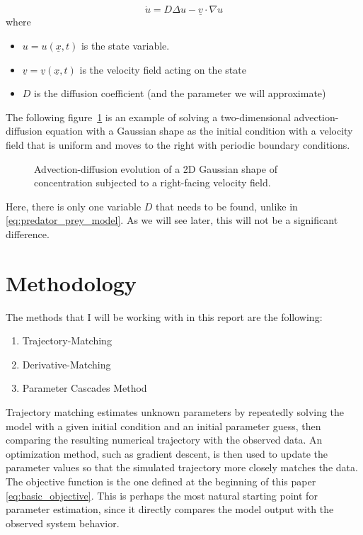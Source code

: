 \documentclass{article}
\begin{document}
\begin{equation}
    \dot u = D \Delta u - \underline{v} \cdot \nabla u
    \label{eq:advection_diffusion_model}
\end{equation}
where
\begin{itemize}
    \item $u = u(\underline{x},t)$ is the state variable.
    \item $\underline{v} = \underline{v}(\underline{x},t)$ is the velocity field acting on the state
    \item $D$ is the diffusion coefficient (and the parameter we will approximate)
\end{itemize}

The following figure~\ref{fig:advection_diffusion_example} is an example of solving a two-dimensional advection-diffusion equation with a Gaussian shape as the initial condition with a velocity field that is uniform and moves to the right with periodic boundary conditions.

\begin{figure}[htbp]
    \centering
    
    \caption{Advection-diffusion evolution of a 2D Gaussian shape of concentration subjected to a right-facing velocity field.}
    \label{fig:advection_diffusion_example}
\end{figure}

Here, there is only one variable $D$ that needs to be found, unlike in \eqref{eq:predator_prey_model}. As we will see later, this will not be a significant difference.

\section{Methodology}
\FloatBarrier

The methods that I will be working with in this report are the following:
\begin{enumerate}
    \item Trajectory-Matching
    \item Derivative-Matching
    \item Parameter Cascades Method
\end{enumerate}

Trajectory matching estimates unknown parameters by repeatedly solving the model with a given initial condition and an initial parameter guess, then comparing the resulting numerical trajectory with the observed data. An optimization method, such as gradient descent, is then used to update the parameter values so that the simulated trajectory more closely matches the data. The objective function is the one defined at the beginning of this paper \eqref{eq:basic_objective}. This is perhaps the most natural starting point for parameter estimation, since it directly compares the model output with the observed system behavior.
\end{document}
